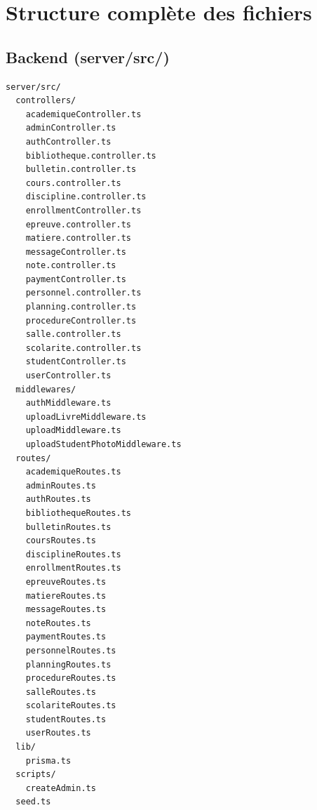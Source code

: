 \documentclass[12pt,a4paper]{report}
\begin{document}
\section{Structure complète des fichiers}
 
\subsection*{Backend (server/src/)}
\begin{lstlisting}
server/src/
  controllers/
    academiqueController.ts
    adminController.ts
    authController.ts
    bibliotheque.controller.ts
    bulletin.controller.ts
    cours.controller.ts
    discipline.controller.ts
    enrollmentController.ts
    epreuve.controller.ts
    matiere.controller.ts
    messageController.ts
    note.controller.ts
    paymentController.ts
    personnel.controller.ts
    planning.controller.ts
    procedureController.ts
    salle.controller.ts
    scolarite.controller.ts
    studentController.ts
    userController.ts
  middlewares/
    authMiddleware.ts
    uploadLivreMiddleware.ts
    uploadMiddleware.ts
    uploadStudentPhotoMiddleware.ts
  routes/
    academiqueRoutes.ts
    adminRoutes.ts
    authRoutes.ts
    bibliothequeRoutes.ts
    bulletinRoutes.ts
    coursRoutes.ts
    disciplineRoutes.ts
    enrollmentRoutes.ts
    epreuveRoutes.ts
    matiereRoutes.ts
    messageRoutes.ts
    noteRoutes.ts
    paymentRoutes.ts
    personnelRoutes.ts
    planningRoutes.ts
    procedureRoutes.ts
    salleRoutes.ts
    scolariteRoutes.ts
    studentRoutes.ts
    userRoutes.ts
  lib/
    prisma.ts
  scripts/
    createAdmin.ts
  seed.ts
\end{lstlisting}
 
\end{document}
